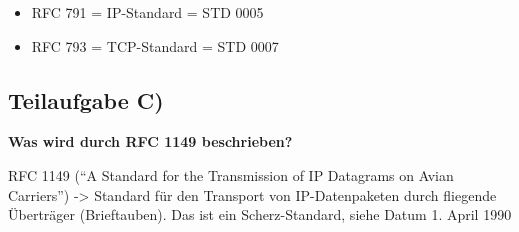 \begin{itemize}
  \item RFC 791 = IP-Standard = STD 0005
  \item RFC 793 = TCP-Standard = STD 0007
\end{itemize}

\subsection{Teilaufgabe C)}
\textbf{Was wird durch RFC 1149 beschrieben?}

RFC 1149 (“A Standard for the Transmission of IP Datagrams on Avian Carriers”)
-> Standard für den Transport von IP-Datenpaketen durch fliegende Überträger (Brieftauben).
Das ist ein Scherz-Standard, siehe Datum 1. April 1990

\clearpage 